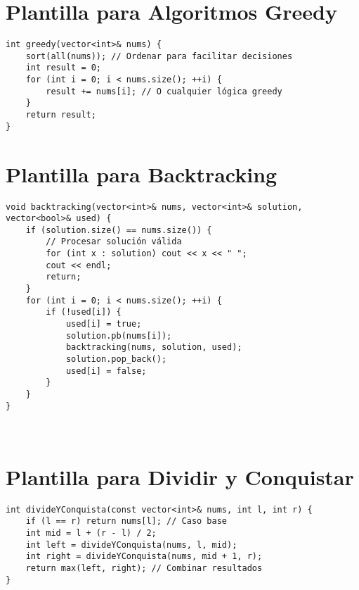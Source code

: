 \section{Plantilla para Algoritmos Greedy}

\begin{lstlisting}[style=cpp]
int greedy(vector<int>& nums) {
    sort(all(nums)); // Ordenar para facilitar decisiones
    int result = 0;
    for (int i = 0; i < nums.size(); ++i) {
        result += nums[i]; // O cualquier lógica greedy
    }
    return result;
}
\end{lstlisting}

\section{Plantilla para Backtracking}

\begin{lstlisting}[style=cpp]
void backtracking(vector<int>& nums, vector<int>& solution, vector<bool>& used) {
    if (solution.size() == nums.size()) {
        // Procesar solución válida
        for (int x : solution) cout << x << " ";
        cout << endl;
        return;
    }
    for (int i = 0; i < nums.size(); ++i) {
        if (!used[i]) {
            used[i] = true;
            solution.pb(nums[i]);
            backtracking(nums, solution, used);
            solution.pop_back();
            used[i] = false;
        }
    }
}



\end{lstlisting}

\section{Plantilla para Dividir y Conquistar}

\begin{lstlisting}[style=cpp]
int divideYConquista(const vector<int>& nums, int l, int r) {
    if (l == r) return nums[l]; // Caso base
    int mid = l + (r - l) / 2;
    int left = divideYConquista(nums, l, mid);
    int right = divideYConquista(nums, mid + 1, r);
    return max(left, right); // Combinar resultados
}
\end{lstlisting}